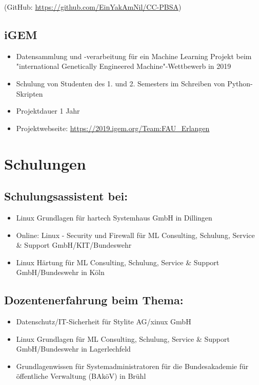 \documentclass{article}
\begin{document}
(GitHub: \href{https://github.com/EinYakAmNil/CC-PBSA}{https://github.com/EinYakAmNil/CC-PBSA})

\subsection{iGEM}

\begin{itemize}
\item Datensammlung und -verarbeitung für ein Machine Learning Projekt beim "international Genetically Engineered Machine"-Wettbewerb in 2019
\item Schulung von Studenten des 1. und 2. Semesters im Schreiben von Python-Skripten
\item Projektdauer 1 Jahr
\item Projektwebseite: \href{https://2019.igem.org/Team:FAU_Erlangen}{https://2019.igem.org/Team:FAU\_Erlangen}
\end{itemize}

\section{Schulungen}

\subsection{Schulungsassistent bei:}

\begin{itemize}
\item Linux Grundlagen für hartech Systemhaus GmbH in Dillingen
\item Online: Linux - Security und Firewall für ML Consulting, Schulung, Service \& Support GmbH/KIT/Bundeswehr
\item Linux Härtung für ML Consulting, Schulung, Service \& Support GmbH/Bundeswehr in Köln
\end{itemize}

\subsection{Dozentenerfahrung beim Thema:}

\begin{itemize}
\item Datenschutz/IT-Sicherheit für Stylite AG/xinux GmbH
\item Linux Grundlagen für ML Consulting, Schulung, Service \& Support GmbH/Bundeswehr in Lagerlechfeld
\item Grundlagenwissen für Systemadministratoren für die Bundesakademie für öffentliche Verwaltung (BAköV) in Brühl
\end{itemize}
\end{document}
